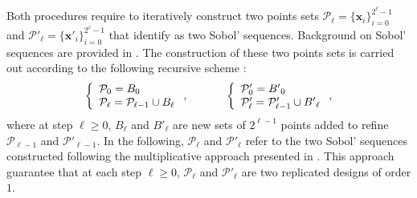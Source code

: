 \documentclass[]{elsarticle}
\theoremstyle{definition}
\newcommand{\bvec}[1]{\boldsymbol{#1}}
\newcommand{\vx}{\bvec{x}}
\begin{document}
Both procedures require to iteratively construct two points sets $\mathcal{P}_\ell=\{\vx_i\}_{i=0}^{2^\ell-1}$ and $\mathcal{P}'_\ell=\{{\vx'}_i\}_{i=0}^{2^\ell-1}$ that identify as two Sobol' sequences. Background on Sobol' sequences are provided in \cite{crass}. The construction of these two points sets is carried out according to the following recursive scheme :
$$\left\lbrace \begin{array}{l}
\mathcal{P}_0= B_0 \\
\mathcal{P}_\ell= \mathcal{P}_{\ell-1} \cup B_\ell \end{array}\right. ,\qquad
\hspace*{0.5cm}
\left\lbrace \begin{array}{l}
\mathcal{P}'_0= {B'}_0 \\
\mathcal{P}'_\ell= \mathcal{P}'_{\ell-1} \cup {B'}_\ell \end{array}\right.,
$$
where at step $\ell\geq0$, $B_\ell$ and $B'_\ell$ are new sets of $2^{\ell-1}$ points added to refine $\mathcal{P}_{\ell-1}$ and $\mathcal{P}'_{\ell-1}$. In the following, $\mathcal{P}_\ell$ and $\mathcal{P}'_\ell$ refer to the two Sobol' sequences constructed following the multiplicative approach presented in \cite{crass}. This approach guarantee that at each step $\ell\geq0$, $\mathcal{P}_{\ell}$ and $\mathcal{P}'_{\ell}$ are two replicated designs of order $1$.
\end{document}

